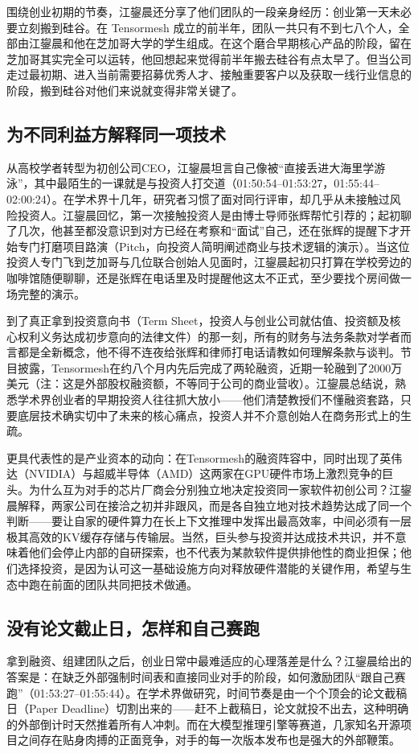 \documentclass[UTF8,a4paper,11pt,fontset=fandol]{ctexart}
\begin{document}
围绕创业初期的节奏，江鋆晨还分享了他们团队的一段亲身经历：创业第一天未必要立刻搬到硅谷。在 Tensormesh 成立的前半年，团队一共只有不到七八个人，全部由江鋆晨和他在芝加哥大学的学生组成。在这个磨合早期核心产品的阶段，留在芝加哥其实完全可以运转，他回想起来觉得前半年搬去硅谷有点太早了。但当公司走过最初期、进入当前需要招募优秀人才、接触重要客户以及获取一线行业信息的阶段，搬到硅谷对他们来说就变得非常关键了。

\subsection{为不同利益方解释同一项技术}
从高校学者转型为初创公司CEO，江鋆晨坦言自己像被“直接丢进大海里学游泳”，其中最陌生的一课就是与投资人打交道（01:50:54–01:53:27，01:55:44–02:00:24）。在学术界十几年，研究者习惯了面对同行评审，却几乎从未接触过风险投资人。江鋆晨回忆，第一次接触投资人是由博士导师张辉帮忙引荐的；起初聊了几次，他甚至都没意识到对方已经在考察和“面试”自己，还在张辉的提醒下才开始专门打磨项目路演（Pitch，向投资人简明阐述商业与技术逻辑的演示）。当这位投资人专门飞到芝加哥与几位联合创始人见面时，江鋆晨起初只打算在学校旁边的咖啡馆随便聊聊，还是张辉在电话里及时提醒他这太不正式，至少要找个房间做一场完整的演示。

到了真正拿到投资意向书（Term Sheet，投资人与创业公司就估值、投资额及核心权利义务达成初步意向的法律文件）的那一刻，所有的财务与法务条款对学者而言都是全新概念，他不得不连夜给张辉和律师打电话请教如何理解条款与谈判。节目披露，Tensormesh在约八个月内先后完成了两轮融资，近期一轮融到了2000万美元（注：这是外部股权融资额，不等同于公司的商业营收）。江鋆晨总结说，熟悉学术界创业者的早期投资人往往抓大放小——他们清楚教授们不懂融资套路，只要底层技术确实切中了未来的核心痛点，投资人并不介意创始人在商务形式上的生疏。

更具代表性的是产业资本的动向：在Tensormesh的融资阵容中，同时出现了英伟达（NVIDIA）与超威半导体（AMD）这两家在GPU硬件市场上激烈竞争的巨头。为什么互为对手的芯片厂商会分别独立地决定投资同一家软件初创公司？江鋆晨解释，两家公司在接洽之初并非跟风，而是各自独立地对技术趋势达成了同一个判断——要让自家的硬件算力在长上下文推理中发挥出最高效率，中间必须有一层极其高效的KV缓存存储与传输层。当然，巨头参与投资并达成技术共识，并不意味着他们会停止内部的自研探索，也不代表为某款软件提供排他性的商业担保；他们选择投资，是因为认可这一基础设施方向对释放硬件潜能的关键作用，希望与生态中跑在前面的团队共同把技术做通。

\subsection{没有论文截止日，怎样和自己赛跑}
拿到融资、组建团队之后，创业日常中最难适应的心理落差是什么？江鋆晨给出的答案是：在缺乏外部强制时间表和直接同业对手的阶段，如何激励团队“跟自己赛跑”（01:53:27–01:55:44）。在学术界做研究，时间节奏是由一个个顶会的论文截稿日（Paper Deadline）切割出来的——赶不上截稿日，论文就投不出去，这种明确的外部倒计时天然推着所有人冲刺。而在大模型推理引擎等赛道，几家知名开源项目之间存在贴身肉搏的正面竞争，对手的每一次版本发布也是强大的外部鞭策。
\end{document}
